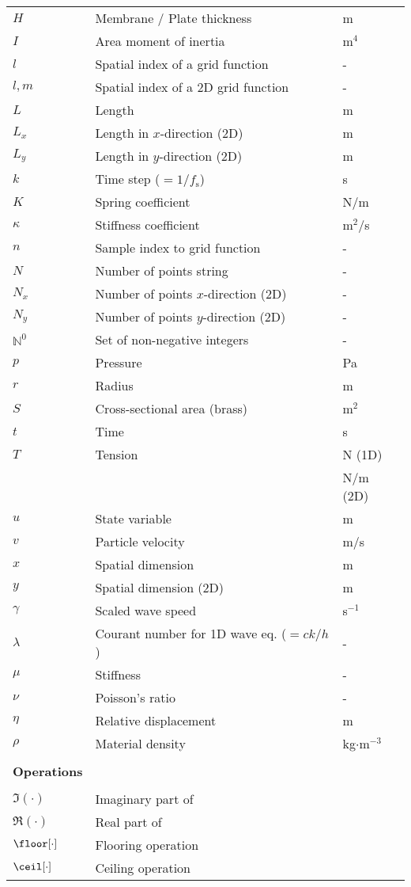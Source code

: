 {\begin{longtable}{ p{2cm} p{6.5cm} p{2.5cm}  }
 $H$ & Membrane / Plate thickness & m \\ 
 $I$ & Area moment of inertia & m$^4$\\
 $l$ & Spatial index of a grid function & - \\
 $l,m$ & Spatial index of a 2D grid function & - \\
 $L$ & Length & m\\
 $L_x$ & Length in $x$-direction (2D) & m\\
 $L_y$ & Length in $y$-direction (2D) & m\\
 $k$ & Time step ($=1/f_\text{s}$) & s\\
 $K$ & Spring coefficient & N/m\\
 $\kappa$ & Stiffness coefficient & m$^2$/s \\
 $n$ & Sample index to grid function & - \\
 $N$ & Number of points string & -\\
 $N_x$ & Number of points $x$-direction (2D) & -\\
 $N_y$ & Number of points $y$-direction (2D) & -\\
 $\mathbb{N}^0$ & Set of non-negative integers %
 & -\\
 $p$ & Pressure & Pa\\
 $r$ & Radius & m\\
 $S$ & Cross-sectional area (brass) & m$^2$\\
 $t$ & Time & s\\
 $T$ & Tension & N (1D)\\
 & & N/m (2D)\\
 $u$ & State variable & m\\ 
 $v$ & Particle velocity & m/s\\ 
 $x$ & Spatial dimension & m\\
 $y$ & Spatial dimension (2D) & m\\
 $\gamma$ & Scaled wave speed & s$^{-1}$\\
 $\lambda$ & Courant number for 1D wave eq. ($=ck/h$) & -\\
 $\mu$ & Stiffness  & -\\
 $\nu$ & Poisson's ratio & -\\
 $\eta$ & Relative displacement & m\\
 $\rho$ & Material density & kg$\cdot$m$^{-3}$\\
 \\
    \hline {\bf Operations}\\\hline
 \\
 $\mathfrak{I}(\cdot)$ & Imaginary part of &\\
 $\mathfrak{R}(\cdot)$ & Real part of & \\
 $\floor[\cdot]$ & Flooring operation &\\
 $\ceil[\cdot]$ & Ceiling operation &%
\end{longtable}}